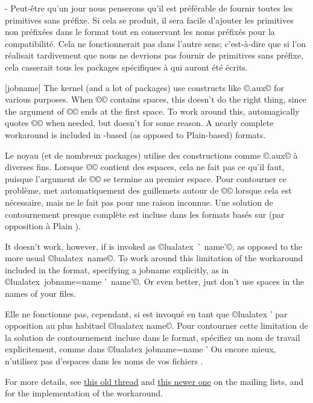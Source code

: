 \documentclass{lltxdoc}
\begin{document}
- Peut-être qu'un jour nous penserons qu'il est préférable de fournir toutes les primitives sans préfixe. Si cela se produit, il sera facile d'ajouter les primitives non préfixées dans le format tout en conservant les noms préfixés pour la compatibilité. Cela ne fonctionnerait pas dans l'autre sens; c'est-à-dire que si l'on réalisait tardivement que nous ne devrions pas fournir de primitives sans préfixe, cela casserait tous les packages spécifiques à \luatex qui auront été écrits.

[jobname]
The \latex kernel (and a lot of packages) use constructs like
©\jobname.aux© for various purposes. When ©\jobname© contains spaces,
this doesn't do the right thing, since the argument of ©© ends at the
first space. To work around this, \pdftex automagically quotes ©\jobname© when
needed, but \luatex doesn't for some reason. A nearly complete workaround is
included in \latex-based (as opposed to Plain-based) \luatex formats.

Le noyau \latex (et de nombreux packages) utilise des constructions comme ©\jobname.aux© à diverses fins. Lorsque ©\jobname© contient des espaces, cela ne fait pas ce qu'il faut, puisque l'argument de ©© se termine au premier espace. Pour contourner ce problème, \pdftex met automatiquement des guillemets autour de ©\jobname© lorsque cela est nécessaire, mais \luatex ne le fait pas pour une raison inconnue. Une solution de contournement presque complète est incluse dans les formats \luatex basés sur \latex (par opposition à Plain \tex).

It doesn't work, however, if \luatex is invoked as ©lualatex ' name'©,
as opposed to the more usual ©lualatex name©. To work around this
limitation of the workaround included in the format, specifying a jobname
explicitly, as in ©lualatex jobname=name ' name'©. Or even better, just
don't use spaces in the names of your \tex files.


Elle ne fonctionne pas, cependant, si \luatex est invoqué en tant que ©lualatex ' par opposition au plus habituel ©lualatex name©. Pour contourner cette limitation de la solution de contournement incluse dans le format, spécifiez un nom de travail explicitement, comme dans ©lualatex jobname=name ' Ou encore mieux, n'utilisez pas d'espaces dans les noms de vos fichiers \tex.

For more details, see
\href{http://www.ntg.nl/pipermail/dev-luatex/2009-April/002549.html}{this old
  thread} and
\href{http://tug.org/pipermail/luatex/2010-August/001986.html}{this newer one}
on the \luatex mailing lists, and  for the
implementation of the workaround.
\end{document}
